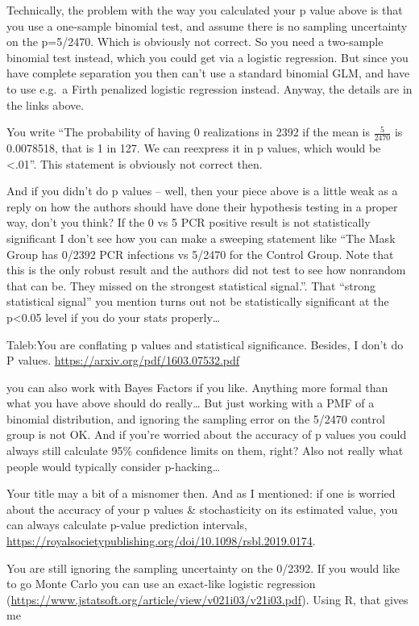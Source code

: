 \documentclass[
]{book}
\begin{document}
Technically, the problem with the way you calculated your p value above is that you use a one-sample binomial test, and assume there is no sampling uncertainty on the p=5/2470. Which is obviously not correct. So you need a two-sample binomial test instead, which you could get via a logistic regression. But since you have complete separation you then can't use a standard binomial GLM, and have to use e.g.~a Firth penalized logistic regression instead. Anyway, the details are in the links above.

You write ``The probability of having 0 realizations in 2392
if the mean is \(\frac{5}{2470}\) is 0.0078518, that is 1 in 127.
We can reexpress it in p values, which would be \textless.01''.
This statement is obviously not correct then.

And if you didn't do p values -- well, then your piece above is a little weak as a reply on how the authors should have done their hypothesis testing in a proper way, don't you think? If the 0 vs 5 PCR positive result is not statistically significant I don't see how you can make a sweeping statement like ``The Mask Group has 0/2392 PCR infections vs 5/2470 for the Control Group. Note that this is the only robust result and the authors did not test to see how nonrandom that can be. They missed on the strongest statistical signal.''. That ``strong statistical signal'' you mention turns out not be statistically significant at the p\textless0.05 level if you do your stats properly\ldots{}

Taleb:You are conflating p values and statistical significance.
Besides, I don't do P values. \url{https://arxiv.org/pdf/1603.07532.pdf}

you can also work with Bayes Factors if you like. Anything more formal than what you have above should do really\ldots{} But just working with a PMF of a binomial distribution, and ignoring the sampling error on the 5/2470 control group is not OK. And if you're worried about the accuracy of p values you could always still calculate 95\% confidence limits on them, right? Also not really what people would typically consider p-hacking\ldots{}

Your title may a bit of a misnomer then. And as I mentioned: if one is worried about the accuracy of your p values \& stochasticity on its estimated value, you can always calculate p-value prediction intervals, \url{https://royalsocietypublishing.org/doi/10.1098/rsbl.2019.0174}.

You are still ignoring the sampling uncertainty on the 0/2392. If you would like to go Monte Carlo you can use an exact-like logistic regression (\url{https://www.jstatsoft.org/article/view/v021i03/v21i03.pdf}). Using R, that gives me
\end{document}
